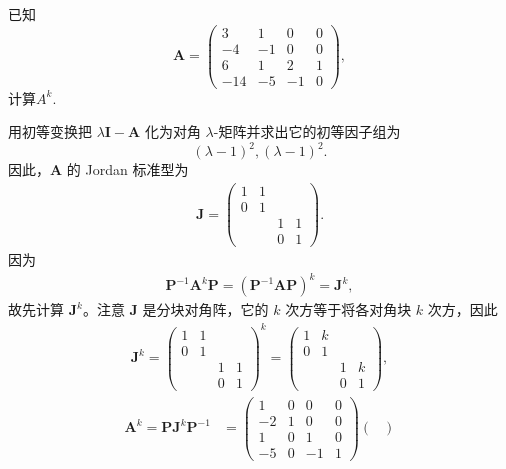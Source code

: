 \documentclass[../../main.tex]{subfiles}%
\begin{document}
\begin{example}
已知
\[
\boldsymbol{A} = 
\begin{pmatrix}
3 & 1 & 0 & 0 \\
-4 & -1 & 0 & 0 \\
6 & 1 & 2 & 1 \\
-14 & -5 & -1 & 0
\end{pmatrix},
\] 
计算$A^k.$
\end{example}
\begin{solution}

用初等变换把 $\lambda\boldsymbol{I} - \boldsymbol{A}$ 化为对角 $\lambda$-矩阵并求出它的初等因子组为
\[
(\lambda - 1)^2, (\lambda - 1)^2.
\]
因此，$\boldsymbol{A}$ 的 Jordan 标准型为
\begin{align*}
\boldsymbol{J} = 
\begin{pmatrix}
1 & 1 & & \\
0 & 1 & & \\
 & & 1 & 1 \\
 & & 0 & 1
\end{pmatrix}.
\end{align*} 
因为
\begin{align*}
\boldsymbol{P}^{-1}\boldsymbol{A}^k\boldsymbol{P} = (\boldsymbol{P}^{-1}\boldsymbol{AP})^k = \boldsymbol{J}^k,
\end{align*}
故先计算 $\boldsymbol{J}^k$。注意 $\boldsymbol{J}$ 是分块对角阵，它的 $k$ 次方等于将各对角块 $k$ 次方，因此
\begin{align*}
\boldsymbol{J}^k = 
\begin{pmatrix}
1 & 1 & & \\
0 & 1 & & \\
    & & 1 & 1 \\
    & & 0 & 1
\end{pmatrix}^k
=
\begin{pmatrix}
1 & k & & \\
0 & 1 & & \\
    & & 1 & k \\
    & & 0 & 1
\end{pmatrix},
\end{align*}
\begin{align*}
\boldsymbol{A}^k = \boldsymbol{PJ}^k\boldsymbol{P}^{-1} 
&=
\begin{pmatrix}
1 & 0 & 0 & 0 \\
-2 & 1 & 0 & 0 \\
1 & 0 & 1 & 0 \\
-5 & 0 & -1 & 1
\end{pmatrix}
\begin{pmatrix}

\end{pmatrix}
\end{align*}
\end{solution}
\end{document}
